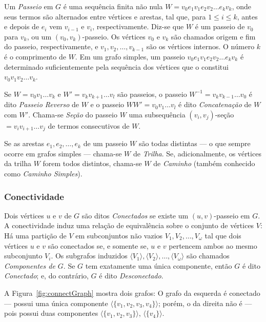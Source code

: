 Um \textit{Passeio} em $G$ é uma sequência finita não nula $W = v_0e_1v_1e_2v_2\dots e_kv_k$, onde seus termos são alternados entre vértices e arestas, tal que, para $1\leq i \leq k$, antes e depois de $e_i$ vem $v_{i-1}$ e $v_i$, respectivamente. Diz-se que $W$ é um passeio de $v_0$ para $v_k$, ou um $(v_0,v_k)$-passeio. Os vértices $v_0$ e $v_k$ são chamados origem e fim do passeio, respectivamente, e $v_1,v_2,\dots,v_{k-1}$ são os vértices internos. O número $k$ é o comprimento de $W$. 
Em um grafo simples, um passeio $v_0e_1v_1e_2v_2\dots e_kv_k$ é determinado suficientemente pela sequência dos vértices que o constitui $v_0v_1v_2\dots v_k$.

Se $W=v_0v_1\dots v_k$ e $W' = v_kv_{k+1}\dots v_l$ são passeios, o passeio $W^{-1} = v_kv_{k-1}\dots v_0$ é dito \textit{Passeio Reverso} de $W$ e o passeio $WW' = v_0v_1\dots v_l$ é dito \textit{Concatenação} de $W$ com $W'$. Chama-se \textit{Seção} do passeio $W$ uma subsequência $(v_i,v_j)$-seção $= v_iv_{i+1}\dots v_j$ de termos consecutivos de $W$. 

Se as arestas $e_1,e_2,\dots,e_k$ de um passeio $W$ são todas distintas --- o que sempre ocorre em grafos simples --- chama-se $W$ de \textit{Trilha}.  Se, adicionalmente, os vértices da trilha $W$ forem todos distintos, chama-se $W$ de \textit{Caminho} (também conhecido como \textit{Caminho Simples}).

\subsubsection{Conectividade}

Dois vértices $u$ e $v$ de $G$ são ditos \textit{Conectados} se existe um $(u,v)$-passeio em $G$. A conectividade induz uma relação de equivalência sobre o conjunto de vértices $V$: Há uma partição de $V$ em subconjuntos não vazios $V_1, V_2, \dots, V_\omega$ tal que dois vértices $u$ e $v$ são conectados se, e somente se, $u$ e $v$ pertencem ambos ao mesmo subconjunto $V_i$. Os subgrafos induzidos $\langle V_1\rangle, \langle V_2\rangle, \dots,\langle V_\omega\rangle$ são chamados \textit{Componentes de $G$}. Se $G$ tem exatamente uma única componente, então $G$ é dito \textit{Conectado}; e, do contrário, $G$ é dito \textit{Desconectado}. 

A Figura~\ref{fig:connectGraph} mostra dois grafos: O grafo da esquerda é conectado --- possui uma única componente $\langle \{v_1,v_2,v_3,v_4\}\rangle$; porém, o da direita não é --- pois possui duas componentes $\langle \{v_1,v_2,v_3\}\rangle$, $\langle \{v_4\}\rangle$.

